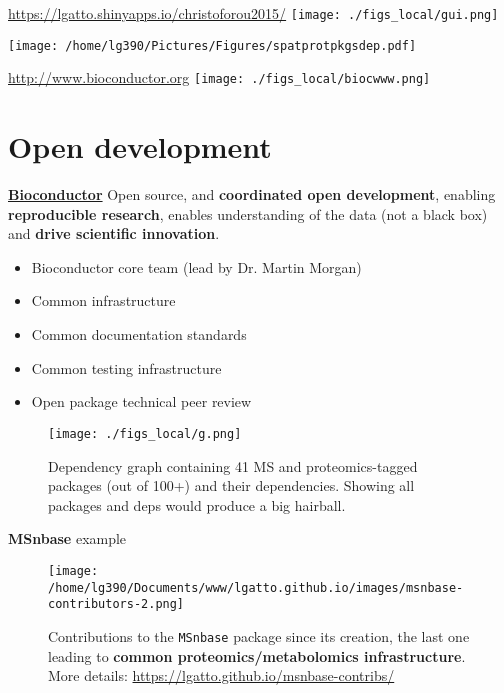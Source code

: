 \begin{frame}{\url{https://lgatto.shinyapps.io/christoforou2015/}}
\texttt{[image: ./figs\_local/gui.png]}
\end{frame}


\begin{frame}
\texttt{[image: /home/lg390/Pictures/Figures/spatprotpkgsdep.pdf]}
\end{frame}


\begin{frame}{\url{http://www.bioconductor.org}}
\texttt{[image: ./figs\_local/biocwww.png]}
\end{frame}

\section{Open development}


\begin{frame}{}
  \href{http://bioconductor.org/}{\textbf{Bioconductor}} Open source,
  and \textbf{coordinated open development}, enabling
  \textbf{reproducible research}, enables understanding of the data
  (not a black box) and \textbf{drive scientific innovation}.
  \begin{itemize}
  \item Bioconductor core team (lead by Dr. Martin Morgan)
  \item Common infrastructure
  \item Common documentation standards
  \item Common testing infrastructure
  \item Open package technical peer review
  \end{itemize}
\end{frame}

\begin{frame}
  \begin{figure}[h]
    \centering
    \texttt{[image: ./figs\_local/g.png]}
    \caption{Dependency graph containing 41 MS and proteomics-tagged
      packages (out of 100+) and their dependencies. Showing all
      packages and deps would produce a big hairball.}
  \end{figure}
\end{frame}

\begin{frame}{\textbf{MSnbase} example}
  \begin{figure}[h]
    \centering
    \texttt{[image: /home/lg390/Documents/www/lgatto.github.io/images/msnbase-contributors-2.png]}
    \caption{Contributions to the \texttt{MSnbase} package since its
      creation, the last one leading to \textbf{common
        proteomics/metabolomics infrastructure}. More details:
      \url{https://lgatto.github.io/msnbase-contribs/}}
    \label{fig:msnbase}
  \end{figure}
  
  
  
\end{frame}